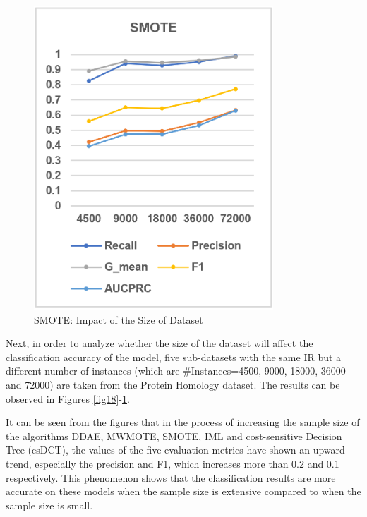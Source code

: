 \begin{figure}[H]
    \centering 
    \begin{minipage}{0.31\textwidth}
        \centering
        \includegraphics[width=0.8\textwidth]{images/fig27}
        \caption{SMOTE: Impact of the Size of Dataset}
        \label{fig27}
    \end{minipage}
\end{figure}

Next, in order to analyze whether the size of the dataset will affect the classification accuracy of the model, five sub-datasets with the same IR but a different number of instances (which are \#Instances=4500, 9000, 18000, 36000 and 72000) are taken from the Protein Homology dataset. The results can be observed in Figures \ref{fig18}-\ref{fig27}.

It can be seen from the figures that in the process of increasing the sample size of the algorithms DDAE, MWMOTE, SMOTE, IML and cost-sensitive Decision Tree (csDCT), the values of the five evaluation metrics have shown an upward trend, especially the precision and F1, which increases more than 0.2 and 0.1 respectively. This phenomenon shows that the classification results are more accurate on these models when the sample size is extensive compared to when the sample size is small.

